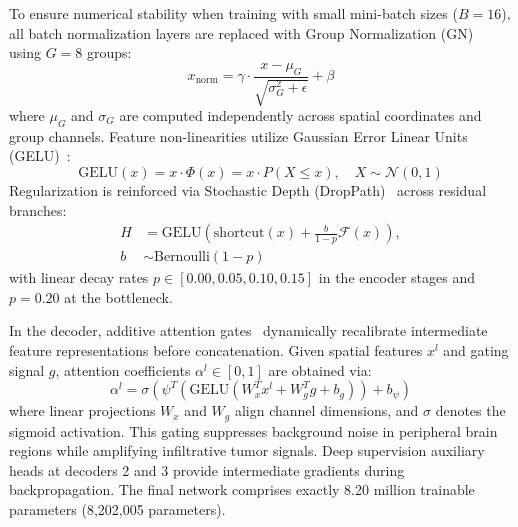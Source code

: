 \documentclass[preprint,12pt,authoryear]{elsarticle}
\begin{document}
To ensure numerical stability when training with small mini-batch sizes ($B=16$), all batch normalization layers are replaced with Group Normalization (GN)~\citep{wu2018group} using $G=8$ groups:
\begin{equation}
x_{\text{norm}} = \gamma \cdot \frac{x - \mu_{G}}{\sqrt{\sigma_{G}^2 + \epsilon}} + \beta
\end{equation}
where $\mu_{G}$ and $\sigma_{G}$ are computed independently across spatial coordinates and group channels. Feature non-linearities utilize Gaussian Error Linear Units (GELU)~\citep{hendrycks2016gaussian}:
\begin{equation}
\text{GELU}(x) = x \cdot \Phi(x) = x \cdot P(X \le x), \quad X \sim \mathcal{N}(0, 1)
\end{equation}
Regularization is reinforced via Stochastic Depth (DropPath)~\citep{huang2016deep} across residual branches:
\begin{equation}
\begin{aligned}
H &= \text{GELU}\left(\text{shortcut}(x) + \frac{b}{1-p}\mathcal{F}(x)\right), \\
b &\sim \text{Bernoulli}(1-p)
\end{aligned}
\end{equation}
with linear decay rates $p \in [0.00, 0.05, 0.10, 0.15]$ in the encoder stages and $p=0.20$ at the bottleneck.

In the decoder, additive attention gates~\citep{oktay2018attention} dynamically recalibrate intermediate feature representations before concatenation. Given spatial features $x^l$ and gating signal $g$, attention coefficients $\alpha^l \in [0, 1]$ are obtained via:
\begin{equation}
\alpha^l = \sigma\left(\psi^T \left(\text{GELU}\left(W_x^T x^l + W_g^T g + b_g\right)\right) + b_\psi\right)
\end{equation}
where linear projections $W_x$ and $W_g$ align channel dimensions, and $\sigma$ denotes the sigmoid activation. This gating suppresses background noise in peripheral brain regions while amplifying infiltrative tumor signals. Deep supervision auxiliary heads at decoders 2 and 3 provide intermediate gradients during backpropagation. The final network comprises exactly 8.20 million trainable parameters (8,202,005 parameters).
\end{document}
